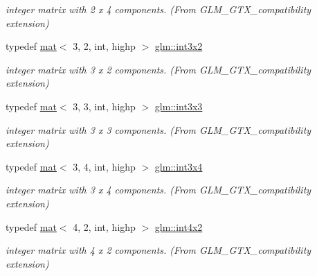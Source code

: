 \begin{DoxyCompactItemize}
\begin{DoxyCompactList}\small\item\em integer matrix with 2 x 4 components. (From G\+L\+M\+\_\+\+G\+T\+X\+\_\+compatibility extension) \end{DoxyCompactList}\item 
\mbox{\label{group__gtx__compatibility_ga3e01f29f95467e49bdfd1b000420d13e}} 
typedef \hyperlink{structglm_1_1mat}{mat}$<$ 3, 2, int, highp $>$ \hyperlink{group__gtx__compatibility_ga3e01f29f95467e49bdfd1b000420d13e}{glm\+::int3x2}
\begin{DoxyCompactList}\small\item\em integer matrix with 3 x 2 components. (From G\+L\+M\+\_\+\+G\+T\+X\+\_\+compatibility extension) \end{DoxyCompactList}\item 
\mbox{\label{group__gtx__compatibility_gac7c574e682731013783283d875602224}} 
typedef \hyperlink{structglm_1_1mat}{mat}$<$ 3, 3, int, highp $>$ \hyperlink{group__gtx__compatibility_gac7c574e682731013783283d875602224}{glm\+::int3x3}
\begin{DoxyCompactList}\small\item\em integer matrix with 3 x 3 components. (From G\+L\+M\+\_\+\+G\+T\+X\+\_\+compatibility extension) \end{DoxyCompactList}\item 
\mbox{\label{group__gtx__compatibility_gaaf72af875fd64f43606aa083d2374195}} 
typedef \hyperlink{structglm_1_1mat}{mat}$<$ 3, 4, int, highp $>$ \hyperlink{group__gtx__compatibility_gaaf72af875fd64f43606aa083d2374195}{glm\+::int3x4}
\begin{DoxyCompactList}\small\item\em integer matrix with 3 x 4 components. (From G\+L\+M\+\_\+\+G\+T\+X\+\_\+compatibility extension) \end{DoxyCompactList}\item 
\mbox{\label{group__gtx__compatibility_ga217e382844361bca6a376e72efa4b360}} 
typedef \hyperlink{structglm_1_1mat}{mat}$<$ 4, 2, int, highp $>$ \hyperlink{group__gtx__compatibility_ga217e382844361bca6a376e72efa4b360}{glm\+::int4x2}
\begin{DoxyCompactList}\small\item\em integer matrix with 4 x 2 components. (From G\+L\+M\+\_\+\+G\+T\+X\+\_\+compatibility extension) \end{DoxyCompactList}\item 

\end{DoxyCompactItemize}
